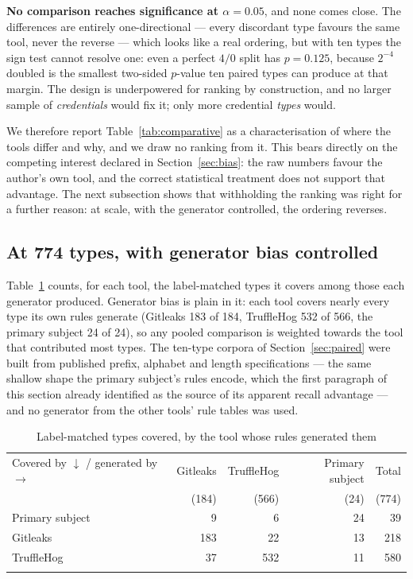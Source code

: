 \documentclass[pdflatex,sn-basic]{sn-jnl}
\begin{document}
\textbf{No comparison reaches significance at $\alpha=0.05$}, and none comes close. The differences are entirely one-directional --- every discordant type favours the same tool, never the reverse --- which looks like a real ordering, but with ten types the sign test cannot resolve one: even a perfect $4/0$ split has $p = 0.125$, because $2^{-4}$ doubled is the smallest two-sided $p$-value ten paired types can produce at that margin. The design is underpowered for ranking by construction, and no larger sample of \emph{credentials} would fix it; only more credential \emph{types} would.

We therefore report Table~\ref{tab:comparative} as a characterisation of where the tools differ and why, and we draw no ranking from it. This bears directly on the competing interest declared in Section~\ref{sec:bias}: the raw numbers favour the author's own tool, and the correct statistical treatment does not support that advantage. The next subsection shows that withholding the ranking was right for a further reason: at scale, with the generator controlled, the ordering reverses.

\subsection{At 774 types, with generator bias controlled}
\label{sec:rq4-scale}

Table~\ref{tab:coverage} counts, for each tool, the label-matched types it covers among those each generator produced. Generator bias is plain in it: each tool covers nearly every type its own rules generate (Gitleaks 183 of 184, TruffleHog 532 of 566, the primary subject 24 of 24), so any pooled comparison is weighted towards the tool that contributed most types. The ten-type corpora of Section~\ref{sec:paired} were built from published prefix, alphabet and length specifications --- the same shallow shape the primary subject's rules encode, which the first paragraph of this section already identified as the source of its apparent recall advantage --- and no generator from the other tools' rule tables was used.

\begin{table}[t]
\centering
\caption{Label-matched types covered, by the tool whose rules generated them}
\label{tab:coverage}
\small
\begin{tabular}{@{}lrrrr@{}}
\toprule
Covered by $\downarrow$ / generated by $\rightarrow$ & Gitleaks & TruffleHog & Primary subject & Total \\
 & (184) & (566) & (24) & (774) \\
\midrule
Primary subject & 9 & 6 & 24 & 39 \\
Gitleaks & 183 & 22 & 13 & 218 \\
TruffleHog & 37 & 532 & 11 & 580 \\
\botrule
\end{tabular}
\end{table}
\end{document}
